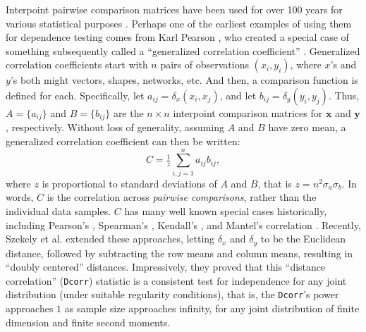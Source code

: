 \documentclass[11pt]{article}
\providecommand{\sct}[1]{{\sc \texttt{#1}}}
\providecommand{\mb}[1]{\boldsymbol{#1}}
\newcommand{\G}{C}
\newcommand{\Dcorr}{\sct{Dcorr}}
\newcommand{\Mantel}{\sct{Mantel}}
\newcommand{\mbx}{\ensuremath{\mb{x}}}
\newcommand{\mby}{\ensuremath{\mb{y}}}
\begin{document}
Interpoint pairwise comparison matrices have been used for over 100 years for various statistical purposes \cite{Maa1996}. Perhaps one of the earliest examples of using them for dependence testing comes from  Karl Pearson \cite{Pearson1895}, who created  a special case of something subsequently called a ``generalized correlation coefficient'' \cite{KendallBook}.
Generalized correlation coefficients start with $n$ pairs of observations $(x_i,y_i)$, where $x$'s and $y$'s both might vectors, shapes, networks, etc.  And then, a comparison function is defined for each.  Specifically, let $a_{ij}=\delta_x(x_i,x_j)$, and let $b_{ij}=\delta_y(y_i,y_j)$.  
Thus, $A=\{a_{ij}\}$ and $B=\{b_{ij}\}$ are the $n \times n$ interpoint comparison matrices for $\mbx$ and $\mby$, respectively.  
Without loss of generality, assuming $A$ and $B$ have zero mean, a generalized correlation coefficient can then be written:
\begin{equation}
\label{generalCoef}
\G= \tfrac{1}{z} {\textstyle \sum_{i,j=1}^n a_{ij} b_{ij}},
\end{equation}
where $z$ is proportional to standard deviations of $A$ and $B$, that is $z=n^2\sigma_a \sigma_b$.
In words, $\G$ is the correlation across \emph{pairwise comparisons}, rather than the individual data samples.  
$\G$ has many well known special cases historically, including Pearson's  \cite{Pearson1895}, Spearman's \cite{Spearman1904},  Kendall's \cite{KendallBook}, and Mantel's correlation \cite{Mantel1967}. %
Recently, Szekely et al. \cite{SzekelyRizzoBakirov2007} extended these approaches, letting $\delta_x$ and $\delta_y$ to be the Euclidean distance, followed by subtracting the row means and column means, resulting in ``doubly centered'' distances.  Impressively, they proved that this ``distance correlation'' (\Dcorr) statistic is a consistent test for independence for any joint distribution (under suitable regularity conditions), that is, the \Dcorr's power approaches $1$ as sample size approaches infinity, for any joint distribution of finite dimension and finite second moments.
\end{document}
